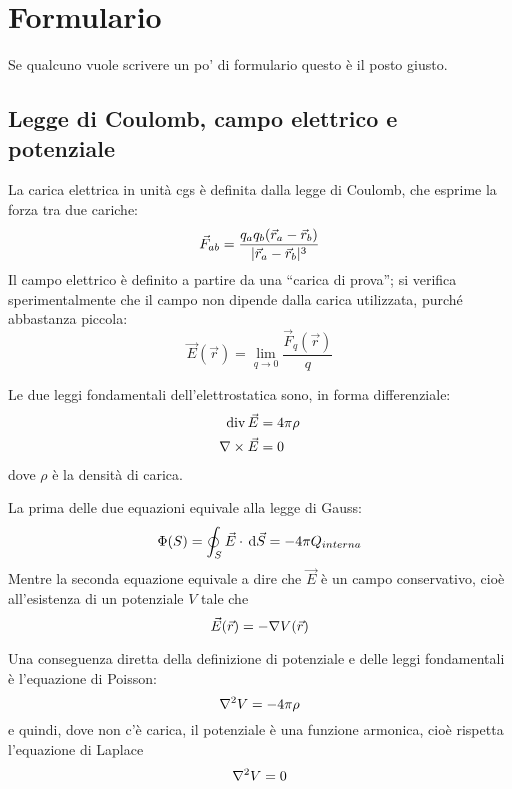 \documentclass[../main.tex]{subfiles}
\begin{document}
\section{Formulario}
\setcounter{equation}{0}
\renewcommand{\theequation}{F.\arabic{equation}}

Se qualcuno vuole scrivere un po' di formulario questo è il posto giusto.

\subsection{Legge di Coulomb, campo elettrico e potenziale}\label{Preliminari}
La carica elettrica in unità cgs è definita dalla legge di Coulomb, che esprime la forza tra due cariche:
\begin{equation}
  \label{Coulomb}
  \vec F_{ab}=\frac{q_aq_b(\vec r_a-\vec r_b)}{\lvert\vec r_a -\vec r_b\rvert^3}
\end{equation}
Il campo elettrico è definito a partire da una ``carica di prova''; si verifica sperimentalmente che il campo non dipende dalla carica utilizzata, purché abbastanza piccola:
\begin{equation}
  \label{CampoElettrico}
  \vec E(\vec r)=\lim_{q \to 0} \frac{\vec F_q(\vec r)}{q}
\end{equation}

Le due leggi fondamentali dell'elettrostatica sono, in forma differenziale:
\begin{subequations}
  \label{DifferenzialiElettrostatica}
  \begin{align}
    \operatorname{div} \vec E &= 4 \pi \rho\label{GaussDifferenziale}\\
    \nabla\times \vec E &= 0
  \end{align}
\end{subequations}
dove $\rho$ è la densità di carica.

La prima delle due equazioni equivale alla legge di Gauss:
\begin{equation}\label{GaussIntegrale}
	\Phi(S)= \oint_S \vec E \cdot \,\mathrm d \vec S=-4\pi Q_{interna}\\
\end{equation}
Mentre la seconda equazione equivale a dire che $\vec E$ è un campo conservativo, cioè all'esistenza di un potenziale $V$ tale che
\begin{equation}
  \label{Potenziale}
  \vec E(\vec r) = - \nabla V(\vec r)
\end{equation}

Una conseguenza diretta della definizione di potenziale e delle leggi fondamentali è l'equazione di Poisson:
\begin{equation}\label{Poisson}
	\nabla^2 V=-4\pi \rho
\end{equation}
e quindi, dove non c'è carica, il potenziale è una funzione armonica, cioè rispetta l'equazione di Laplace
\begin{equation}\label{Laplace}
	\nabla^2 V=0
\end{equation}
\end{document}

